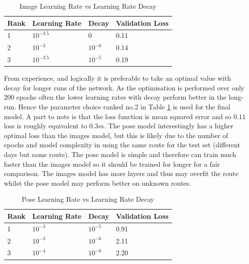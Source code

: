 \documentclass[11pt,twoside]{report}
\begin{document}
\noindent \begin{table}[h!]
	\centering
	\begin{tabular}{|p{1.0cm}|p{3.0cm}|p{3.0cm}|p{3.0cm}|}
		\hline
		\textbf{Rank}&\textbf{Learning Rate} & \textbf{Decay} &  \textbf{Validation Loss}       \\ \hline
		1  & $10^{-3.5}$   &   0 & 0.11     \\ \hline
		2  & $10^{-3}$   &   $10^{-6}$ & 0.14     \\ \hline
		3  & $10^{-3.5}$    &    $10^{-5}$ & 0.19   \\ \hline
		
	\end{tabular}
	\caption{Image Learning Rate vs Learning Rate Decay}
	\label{image_lr_lr_decay_table}
\end{table}

From experience, and logically it is preferable to take an optimal value with decay for longer runs of the network. As the optimisation is performed over only 200 epochs often the lower learning rates with decay perform better in the long-run. Hence the parameter choice ranked no.2 in Table \ref{image_lr_lr_decay_table} is used for the final model. A part to note is that the loss function is mean squared error and so $0.11$ loss is roughly equivalent to $0.3m$. The pose model interestingly has a higher optimal loss than the images model, but this is likely due to the number of epochs and model complexity in using the same route for the test set (different days but same route). The pose model is simple and therefore can train much faster than the images model so it should be trained for longer for a fair comparison. The images model has more layers and thus may overfit the route whilst the pose model may perform better on unknown routes.

\noindent \begin{table}[h!]
	\centering
	\begin{tabular}{|p{1.0cm}|p{3.0cm}|p{3.0cm}|p{3.0cm}|}
		\hline
		\textbf{Rank}&\textbf{Learning Rate} & \textbf{Decay} &  \textbf{Validation Loss}       \\ \hline
		1  & $10^{-3}$   &  $10^{-5}$ & 0.91     \\ \hline
		2  & $10^{-3}$   &   $10^{-6}$ & 2.11    \\ \hline
		3  & $10^{-4}$    &    $10^{-6}$ & 2.20   \\ \hline
		
	\end{tabular}
	\caption{Pose Learning Rate vs Learning Rate Decay}
	\label{pose_lr_lr_decay_table}
\end{table}
 
\end{document}
